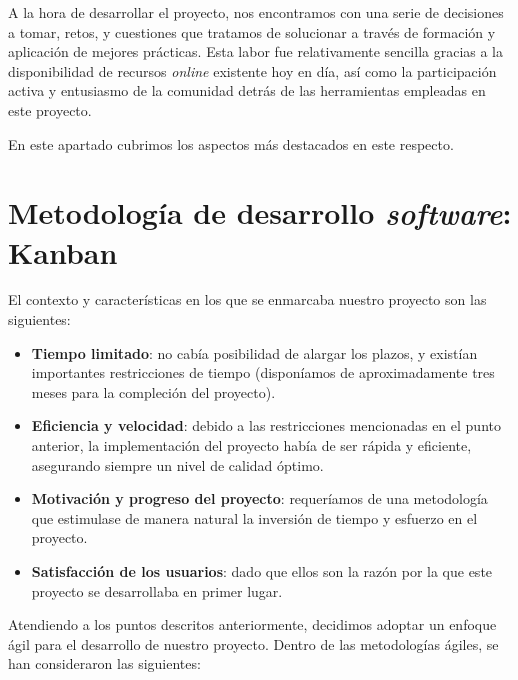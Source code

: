 
A la hora de desarrollar el proyecto, nos encontramos con una serie de decisiones a tomar, retos, y cuestiones que tratamos de solucionar a través de formación y aplicación de mejores prácticas. Esta labor fue relativamente sencilla gracias a la disponibilidad de recursos \emph{online} existente hoy en día, así como la participación activa y entusiasmo de la comunidad detrás de las herramientas empleadas en este proyecto.

En este apartado cubrimos los aspectos más destacados en este respecto.

\section{Metodología de desarrollo \emph{software}: Kanban}

El contexto y características en los que se enmarcaba nuestro proyecto son las siguientes:

\vspace{-0.5cm}
\begin{itemize}
	\item [\textbullet] \textbf{Tiempo limitado}: no cabía posibilidad de alargar los plazos, y existían importantes restricciones de tiempo (disponíamos de aproximadamente tres meses para la compleción del proyecto).
	\item [\textbullet] \textbf{Eficiencia y velocidad}: debido a las restricciones mencionadas en el punto anterior, la implementación del proyecto había de ser rápida y eficiente, asegurando siempre un nivel de calidad óptimo.
	\item [\textbullet] \textbf{Motivación y progreso del proyecto}: requeríamos de una metodología que estimulase de manera natural la inversión de tiempo y esfuerzo en el proyecto.
	\item [\textbullet] \textbf{Satisfacción de los usuarios}: dado que ellos son la razón por la que este proyecto se desarrollaba en primer lugar.
\end{itemize}

Atendiendo a los puntos descritos anteriormente, decidimos adoptar un enfoque ágil para el desarrollo de nuestro proyecto. Dentro de las metodologías ágiles, se han consideraron las siguientes:

